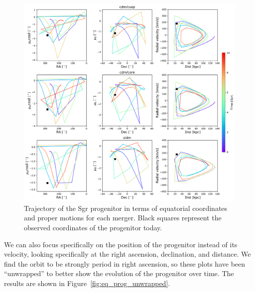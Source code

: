 \begin{figure}
    \centering
    \includegraphics[width=1.0\linewidth]{figs/equatorial_progenitor.pdf}
    \caption{%
        Trajectory of the Sgr progenitor in terms of equatorial coordinates and
        proper motions for each merger. Black squares represent the observed
        coordinates of the progenitor today.
    }
    \label{fig:eq_prog}
\end{figure}

We can also focus specifically on the position of the progenitor instead of its
velocity, looking specifically at the right ascension, declination, and
distance. We find the orbit to be strongly period in right ascension, so these
plots have been ``unwrapped'' to better show the evolution of the progenitor
over time. The results are shown in Figure~\ref{fig:eq_prog_unwrapped}.


